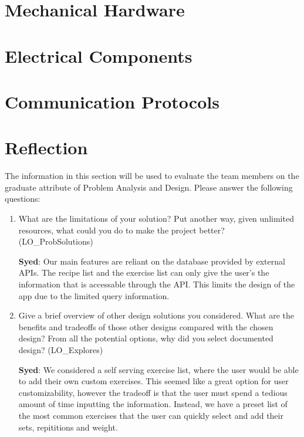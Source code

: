 \documentclass[12pt, titlepage]{article}
\begin{document}
\section{Mechanical Hardware}

\section{Electrical Components}

\section{Communication Protocols}

\section{Reflection}

The information in this section will be used to evaluate the team members on the
graduate attribute of Problem Analysis and Design.  Please answer the following questions:

\begin{enumerate}
  \item What are the limitations of your solution?  Put another way, given
  unlimited resources, what could you do to make the project better? (LO\_ProbSolutions)
	
\textbf{Syed}: Our main features are reliant on the database provided by external APIs. The recipe list and the exercise list can only give the user's the information that is accessable through the API. This limits the design of the app due to the limited query information. 

  \item Give a brief overview of other design solutions you considered.  What
  are the benefits and tradeoffs of those other designs compared with the chosen
  design?  From all the potential options, why did you select documented design?
  (LO\_Explores)

\textbf{Syed}: We considered a self serving exercise list, where the user would be able to add their own custom exercises. This seemed like a great option for user customizability, however the tradeoff is that the user must spend a tedious amount of time inputting the information. Instead, we have a preset list of the most common exercises that the user can quickly select and add their sets, repititions and weight.
\end{enumerate}
\end{document}
